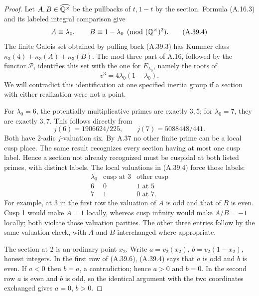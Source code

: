 \begin{proof}
Let $A,B\in\widehat{\mathbb Q^\times}$ be the pullbacks of $t,1-t$ by the
section.  Formula (A.16.3) and its labeled integral comparison give
\[
     A\equiv\lambda_0,\qquad B\equiv1-\lambda_0
                      \pmod{(\mathbb Q^\times)^2}.
\tag{A.39.4}
\]
The finite Galois set obtained by pulling back (A.39.3) has Kummer
class $\kappa_3(4)+\kappa_3(A)+\kappa_3(B)$.  The mod-three part
of A.16, followed by the functor $\mathcal P$, identifies this set
with the one for $E_{\lambda_0}$, namely the roots of
\[
                      v^3=4\lambda_0(1-\lambda_0).
\tag{A.39.5}
\]
We will contradict this identification at one specified inertia
group if a section with either realization were not a point.

For $\lambda_0=6$, the potentially multiplicative primes are exactly
$3,5$; for $\lambda_0=7$, they are exactly $3,7$.  This follows
directly from
\[
          j(6)=1906624/225,\qquad j(7)=5088448/441.
\]
Both have $2$-adic $j$-valuation six.  By A.37 no other finite prime
can be a local cusp place.  The same result recognizes every section
having at most one cusp label.  Hence a section not already
recognized must be cuspidal at both listed primes, with distinct
labels.  The local valuations in (A.39.4) force those labels:
\[
\begin{array}{c|cc}
 \lambda_0&\text{cusp at }3&\text{other cusp}\\ \hline
 6&0&1\text{ at }5\\
 7&1&0\text{ at }7.
\end{array}
\tag{A.39.6}
\]
For example, at $3$ in the first row the valuation of $A$ is odd
and that of $B$ is even.  Cusp 1 would make $A=1$ locally, whereas
cusp infinity would make $A/B=-1$ locally; both violate those
valuation parities.  The other three entries follow by the same
valuation check, with $A$ and $B$ interchanged where appropriate.

The section at 2 is an ordinary point $x_2$.  Write
$a=v_2(x_2)$, $b=v_2(1-x_2)$, honest integers.  In the first row of
(A.39.6), (A.39.4) says that $a$ is odd and $b$ is even.  If $a<0$
then $b=a$, a contradiction; hence $a>0$ and $b=0$.  In the second
row $a$ is even and $b$ is odd, so the identical argument with the
two coordinates exchanged gives $a=0$, $b>0$.


\end{proof}
